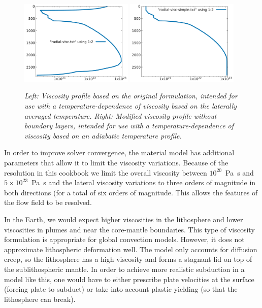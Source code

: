 \begin{figure}
  \includegraphics[width=0.48\textwidth]{cookbooks/steinberger/doc/radial-visc.pdf}
  \includegraphics[width=0.48\textwidth]{cookbooks/steinberger/doc/radial-visc-simple.pdf}
  \caption{\it Left: Viscosity profile based on the original \cite{stca06} formulation, intended for use with a temperature-dependence of viscosity based on the laterally averaged temperature. Right: Modified viscosity profile without boundary layers, intended for use with a temperature-dependence of viscosity based on an adiabatic temperature profile.}
  \label{fig:steinberger-viscosity}
\end{figure}

In order to improve solver convergence, the material model has additional parameters that allow it to limit the viscosity variations. 
Because of the resolution in this cookbook we limit the overall viscosity
between $10^{20}$~Pa~s and $5 \times 10^{23}$~Pa~s and the lateral viscosity variations to 
three orders of magnitude in both directions (for a total of six orders of
magnitude. This allows the features of the flow field to be resolved. 

In the Earth, we would expect higher viscosities in the lithosphere and 
lower viscosities in plumes and near the core-mantle boundaries. 
This type of viscosity formulation is appropriate for global convection models. 
However, it does not approximate lithospheric deformation well. 
The model only accounts for diffusion creep, so the 
lithosphere has a high viscosity and forms a stagnant lid on top of the 
sublithospheric mantle. In order to achieve more realistic subduction in a model like this, 
one would have to either prescribe plate velocities at the surface 
(forcing plate to subduct) or take into account plastic yielding (so that
the lithosphere can break).

